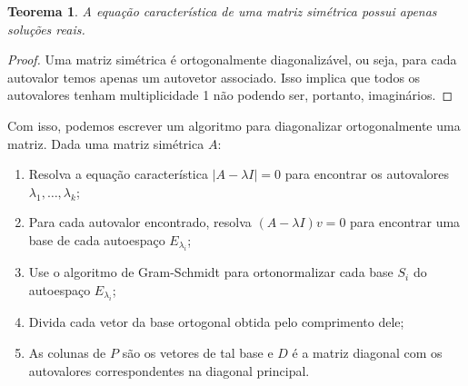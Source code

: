 \documentclass{article}
\newtheorem{theorem}{Teorema}[section]
\begin{document}
\begin{theorem}
	A equação característica de uma matriz simétrica possui apenas soluções reais.
\end{theorem}

\begin{proof}
	Uma matriz simétrica é ortogonalmente diagonalizável, ou seja, para cada autovalor temos apenas um autovetor associado. Isso implica que todos os autovalores tenham multiplicidade 1 não podendo ser, portanto, imaginários.
\end{proof}

\par\vspace{0.3cm} Com isso, podemos escrever um algoritmo para diagonalizar ortogonalmente uma matriz. Dada uma matriz simétrica $A$:

\begin{enumerate}
	\item Resolva a equação característica $|A - \lambda I| = 0$ para encontrar os autovalores $\lambda_1, \dots, \lambda_k$;
	\item Para cada autovalor encontrado, resolva $ (A - \lambda I)v = 0 $ para encontrar uma base de cada autoespaço $E_{\lambda_i}$;
	\item Use o algoritmo de Gram-Schmidt para ortonormalizar cada base $S_i$ do autoespaço $E_{\lambda_i}$;
	\item Divida cada vetor da base ortogonal obtida pelo comprimento dele;
	\item As colunas de $P$ são os vetores de tal base e $D$ é a matriz diagonal com os autovalores correspondentes na diagonal principal.
\end{enumerate}
\end{document}
